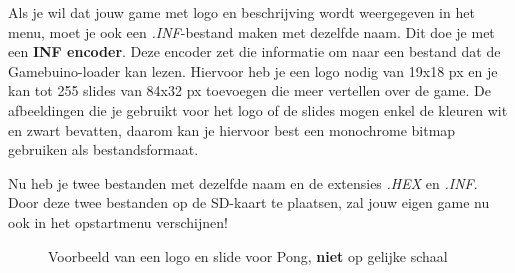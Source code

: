 \documentclass[a4paper,titlepage,12pt]{article}
\begin{document}
	Als je wil dat jouw game met logo en beschrijving wordt weergegeven in het menu, moet je ook een \emph{.INF}-bestand maken met dezelfde naam. Dit doe je met een \textbf{INF encoder}\cite{GitHub:Rodot:InfEncoder}. Deze encoder zet die informatie om naar een bestand dat de Gamebuino-loader kan lezen. Hiervoor heb je een logo nodig van 19x18 px en je kan tot 255 slides van 84x32 px toevoegen die meer vertellen over de game. De afbeeldingen die je gebruikt voor het logo of de slides mogen enkel de kleuren wit en zwart bevatten, daarom kan je hiervoor best een monochrome bitmap gebruiken als bestandsformaat.
	
	Nu heb je twee bestanden met dezelfde naam en de extensies \emph{.HEX} en \emph{.INF}. Door deze twee bestanden op de SD-kaart te plaatsen, zal jouw eigen game nu ook in het opstartmenu verschijnen!
	
	\begin{figure}[!ht]
		\centering
		\caption{\label{fig:logo_slide}Voorbeeld van een logo en slide voor Pong, \textbf{niet} op gelijke schaal}
	\end{figure}
	
	\newpage
	
	
\end{document}
